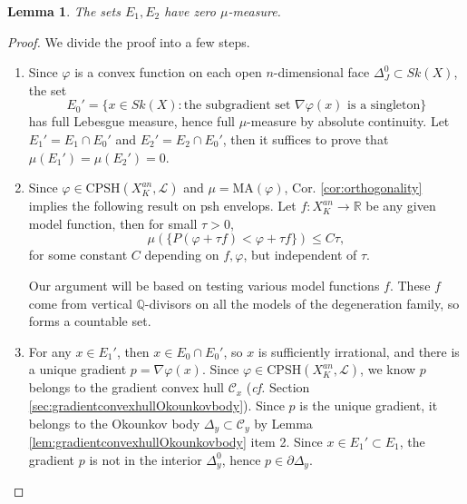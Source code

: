 \documentclass[a4paper]{article}
\newtheorem{lem}[thm]{Lemma}
\theoremstyle{definition}
\newcommand{\cf}{\emph{cf.} }
\newcommand{\R}{\mathbb{R}}
\newcommand{\Q}{\mathbb{Q}}
\begin{document}
	
	
	
	\begin{lem}\label{lem:nullmeasure}
The sets $E_1, E_2$ have zero $\mu$-measure.
	\end{lem}
	
	
	
	

		
	\begin{proof}
		We divide the proof into a few steps.
		\begin{enumerate}
			\item  Since $\varphi$ is a convex function on each open $n$-dimensional face $\Delta_J^0\subset Sk(X)$, the set
			\[
			E_0'= \{    x\in Sk(X): \text{the subgradient set $\nabla \varphi(x)$ is a singleton}     \}
			\]
			has full Lebesgue measure, hence full $\mu$-measure by absolute continuity. Let $E_1'=E_1\cap E_0'$ and $E_2'=E_2\cap E_0'$, then it suffices to prove that $\mu(E_1')=\mu( E_2')=0$.  
			
			
			
			\item Since $\varphi\in  \text{CPSH}(X_K^{an}, \mathcal{L})$ and $\mu= \text{MA}(\varphi)$, Cor. \ref{cor:orthogonality} implies the following result on psh envelops.  Let $f:X_K^{an}\to \R$ be any given model function,  then for small $\tau>0$, 
			\begin{equation}
			\mu( \{      P(\varphi+\tau f) <  \varphi+\tau  f        \}   ) \leq C\tau,
			\end{equation}
			for some constant $C$ depending on $f, \varphi$, but independent of $\tau$. 
			
			
			Our argument will be based on testing various model functions $f$. These $f$ come from 
 vertical $\Q$-divisors on all the models of the degeneration family, so forms a  countable set.
			
			
			
			\item For any $x\in E_1'$, then $x\in E_0\cap E_0'$, so $x$ is sufficiently irrational, and there is a unique gradient $p=\nabla \varphi(x)$. Since $\varphi\in  \text{CPSH}(X_K^{an}, \mathcal{L})$, we know $p$ belongs to the gradient convex hull $\mathcal{C}_x$ (\cf Section \ref{sec:gradientconvexhullOkounkovbody}). Since $p$ is the unique gradient, it belongs to the Okounkov body $\Delta_y\subset \mathcal{C}_y$ by Lemma \ref{lem:gradientconvexhullOkounkovbody} item 2. Since $x\in E_1'\subset E_1$, the gradient $p$ is not in the interior $\Delta_y^0$, hence $p\in \partial \Delta_y$.
			

\end{enumerate}
\end{proof}
\end{document}
